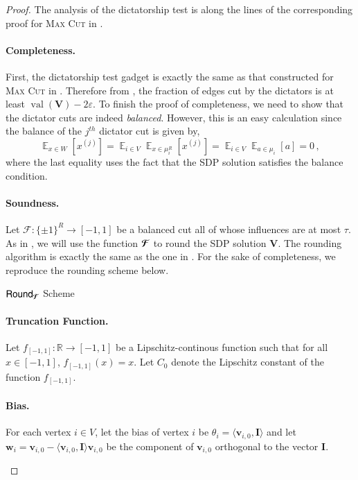 \documentclass[11pt]{article}
\theoremstyle{definition}
\newenvironment{mybox}
{\center \noindent\begin{boxedminipage}{1.0\linewidth}}
{\end{boxedminipage}
\noindent
}
\newcommand{\iprod}[1]{\langle#1\rangle}
\newcommand{\Esymb}{\mathbb{E}}
\DeclareMathOperator*{\E}{\Esymb}
\newcommand{\sbits}{\{\pm1\}}
\renewcommand{\vec}[1]{{\bm{#1}}}
\newcommand{\mcom}{\,,}
\DeclareMathOperator{\val}{val}
\newcommand{\R}{\mathbb R}
\newcommand{\problemmacro}[1]{\texorpdfstring{\textsc{#1}}{#1}\xspace}
\newcommand{\maxcut}{\problemmacro{Max Cut}}
\newcommand{\cF}{\mathcal F}
\let\epsilon=\varepsilon
\numberwithin{equation}{section}
\let\origparagraph\paragraph
\renewcommand{\paragraph}[1]{\origparagraph{#1.}}
\newcommand{\mrf}[1]{\bm{\mathcal{\uppercase{#1}}}}
\newcommand{\msf}[1]{\mathsf{#1}}
\newcommand{\round}{\msf{Round}}
\newcommand{\struncate}{f_{[-1,1]}}
\begin{document}
\begin{proof}
The analysis of the dictatorship test is along the lines of the
corresponding proof for \maxcut in \cite{Raghavendra08}.

\paragraph{Completeness}
First, the dictatorship test gadget is exactly the same as that
constructed for \maxcut in \cite{Raghavendra08}.  Therefore from \cite{Raghavendra08}, the
fraction of edges cut by the dictators is at least $\val(\vec V) - 2\epsilon$.
To finish the proof of completeness, we need to show that the dictator
cuts are indeed {\it balanced}.  However, this is an easy calculation
since the balance of the $j^{th}$ dictator cut is given by,
$$ \E_{x \in W} [x^{(j)}] = \E_{i \in V} \E_{x \in \mu_i^R}[x^{(j)}] =
\E_{i \in V} \E_{a \in \mu_i}[a] = 0 \mcom$$
where the last equality uses the fact that the SDP solution satisfies
the balance condition.

\paragraph{Soundness}
Let $\cF : \sbits^R \to [-1,1]$ be a balanced cut all of whose
influences are at most $\tau$.  As in \cite{Raghavendra08}, we will
use the function $\mrf{F}$ to round the SDP solution $\vec V$.  The
rounding algorithm is exactly the same as the one in
\cite{Raghavendra08}.  For the sake of completeness, we reproduce the
rounding scheme below.

\begin{mybox}
      $\round_{\mrf{F}}$ Scheme
      \paragraph{Truncation Function} Let $\struncate : \R \to [-1,1]$ be a Lipschitz-continous
function such that for all $x \in [-1,1]$, $\struncate(x)
= x$.  Let $C_0$ denote the Lipschitz constant of the function
$\struncate$.



\paragraph{Bias}  For each vertex $i \in V$, let the bias of vertex
$i$ be $\theta_i = \iprod{\vec v_{i,0}, \vec I}$ and let $\vec w_i
=\vec v_{i,0} -
\iprod{\vec v_{i,0},\vec I} \vec v_{i,0}$ be the component of $\vec v_{i,0}$ orthogonal to the vector
$\vec I$.

\end{mybox}
\end{proof}
\end{document}
